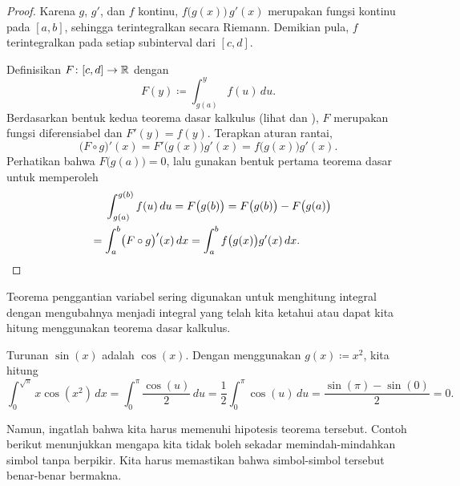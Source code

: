 \begin{proof}
Karena $g$, $g'$, dan $f$ kontinu, $f\bigl(g(x)\bigr)\,g'(x)$
merupakan fungsi kontinu pada $[a,b]$, sehingga terintegralkan secara Riemann.
Demikian pula, $f$ terintegralkan pada setiap subinterval dari $[c,d]$.

Definisikan $F \colon [c,d] \to {\mathbb{R}}$ dengan
\begin{equation*}
F(y) \coloneqq \int_{g(a)}^{y} f(u)\,du .
\end{equation*}
Berdasarkan bentuk kedua teorema dasar
kalkulus
(lihat  dan ),
$F$ merupakan fungsi diferensiabel dan $F'(y) = f(y)$.  Terapkan aturan
rantai,
\begin{equation*}
\bigl( F \circ g \bigr)' (x) =
F'\bigl(g(x)\bigr) g'(x)
=
f\bigl(g(x)\bigr) g'(x) .
\end{equation*}
Perhatikan bahwa $F\bigl(g(a)\bigr) = 0$, lalu
gunakan bentuk pertama teorema dasar
untuk memperoleh
\begin{multline*}
\qquad %
\int_{g(a)}^{g(b)} f(u)\,du = F\bigl(g(b)\bigr) = F\bigl(g(b)\bigr)-F\bigl(g(a)\bigr)
\\
=
\int_a^b 
\bigl( F \circ g \bigr)' (x) \,dx
=
\int_a^b 
f\bigl(g(x)\bigr) g'(x)
\,dx .
\qquad %
\qedhere
\end{multline*}
\end{proof}

Teorema penggantian variabel sering digunakan untuk menghitung integral dengan mengubahnya
menjadi integral yang telah kita ketahui atau dapat kita hitung menggunakan teorema dasar
kalkulus.

\begin{example}
Turunan $\sin(x)$ adalah $\cos(x)$.
Dengan menggunakan $g(x) \coloneqq x^2$, kita hitung
\begin{equation*}
\int_0^{\sqrt{\pi}} x \cos(x^2) \, dx = \int_0^\pi \frac{\cos(u)}{2} \, du
=
\frac{1}{2}
\int_0^\pi \cos(u) \, du
=
\frac{
\sin(\pi) - \sin(0)
}{2}
=
0 .
\end{equation*}
\end{example}

Namun, ingatlah bahwa kita harus memenuhi hipotesis teorema tersebut.  Contoh
berikut menunjukkan mengapa kita tidak boleh sekadar
memindah-mindahkan simbol tanpa berpikir.
Kita harus memastikan bahwa simbol-simbol tersebut benar-benar bermakna.

